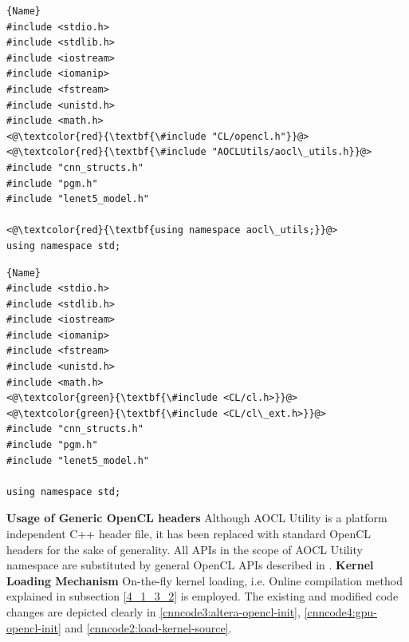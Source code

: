 \newcommand{\grn}{\makebox[0pt][l]{\color{hg}\rule[-4pt]{0.9\linewidth}{10pt}}}
\newcommand{\rd}{\makebox[0pt][l]{\color{hr}\rule[-4pt]{0.9\linewidth}{10pt}}}
\noindent\begin{minipage}{.45\textwidth}
\begin{lstlisting}[caption=Header files for Altera FPGA,frame=tlrb]{Name}
#include <stdio.h>
#include <stdlib.h>
#include <iostream>
#include <iomanip>
#include <fstream>
#include <unistd.h>
#include <math.h>
<@\textcolor{red}{\textbf{\#include "CL/opencl.h"}}@>
<@\textcolor{red}{\textbf{\#include "AOCLUtils/aocl\_utils.h}}@>
#include "cnn_structs.h"
#include "pgm.h"
#include "lenet5_model.h"

<@\textcolor{red}{\textbf{using namespace aocl\_utils;}}@>
using namespace std;
\end{lstlisting}
\end{minipage}\hfill
\begin{minipage}{.45\textwidth}
\begin{lstlisting}[caption=Header files for \\ GPU,frame=tlrb]{Name}
#include <stdio.h>
#include <stdlib.h>
#include <iostream>
#include <iomanip>
#include <fstream>
#include <unistd.h>
#include <math.h>
<@\textcolor{green}{\textbf{\#include <CL/cl.h>}}@>
<@\textcolor{green}{\textbf{\#include <CL/cl\_ext.h>}}@>
#include "cnn_structs.h"
#include "pgm.h"
#include "lenet5_model.h"

using namespace std;
\end{lstlisting}
\end{minipage}\newline
\textbf{Usage of Generic OpenCL headers} \newline
Although AOCL Utility is a platform independent C++ header file, it has been replaced with standard OpenCL headers for the sake of generality. All APIs in the scope of AOCL Utility namespace are substituted by general OpenCL APIs described in \cite{opencl_khronos}. \newline \newline
\textbf{Kernel Loading Mechanism}\newline
On-the-fly kernel loading, i.e. Online compilation method explained in subsection \ref{4_1_3_2} is employed. The existing and modified code changes are depicted clearly in \ref{cnncode3:altera-opencl-init}, \ref{cnncode4:gpu-opencl-init} and \ref{cnncode2:load-kernel-source}.\newline \newline
